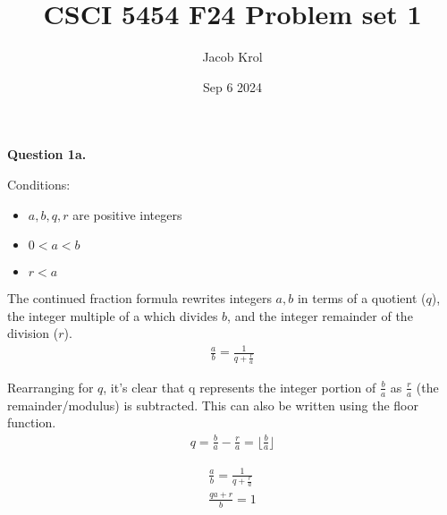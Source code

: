 \documentclass{article}
\title{CSCI 5454 F24 Problem set 1}
\author{Jacob Krol}
\date{Sep 6 2024}
\begin{document}
\maketitle

\textbf{Question 1a.}

Conditions:
\begin{itemize}
    \item $a,b,q,r$ are positive integers
    \item $0<a<b$
    \item $r<a$
\end{itemize}

The continued fraction formula rewrites integers $a,b$ in terms of a quotient 
($q$), the integer multiple of a which divides $b$, and the integer 
remainder of the division ($r$).
\begin{align*}
    \frac{a}{b} = \frac{1}{q + \frac{r}{a}}
\end{align*}

Rearranging for $q$, it's clear that q represents the integer portion of 
$\frac{b}{a}$ as $\frac{r}{a}$ (the remainder/modulus) is subtracted. 
This can also be written using the floor function.
\begin{align*}
    q = \frac{b}{a} - \frac{r}{a} = \lfloor \frac{b}{a} \rfloor
\end{align*}










\begin{align*}
    \frac{a}{b} = \frac{1}{q + \frac{r}{a}}\\
    \frac{qa+r}{b} = 1
\end{align*}
\end{document}
